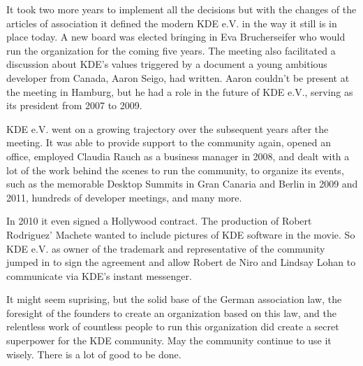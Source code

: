 It took two more years to implement all the decisions but with the changes of the articles of association it defined the modern KDE e.V. in the way it still is in place today. A new board was elected bringing in Eva Brucherseifer who would run the organization for the coming five years. The meeting also facilitated a discussion about KDE's values triggered by a document a young ambitious developer from Canada, Aaron Seigo, had written. Aaron couldn't be present at the meeting in Hamburg, but he had a role in the future of KDE e.V., serving as its president from 2007 to 2009.

KDE e.V. went on a growing trajectory over the subsequent years after the meeting. It was able to provide support to the community again, opened an office, employed Claudia Rauch as a business manager in 2008, and dealt with a lot of the work behind the scenes to run the community, to organize its events, such as the memorable Desktop Summits in Gran Canaria and Berlin in 2009 and 2011, hundreds of developer meetings, and many more.

In 2010 it even signed a Hollywood contract. The production of Robert Rodriguez' Machete wanted to include pictures of KDE software in the movie. So KDE e.V. as owner of the trademark and representative of the community jumped in to sign the agreement and allow Robert de Niro and Lindsay Lohan to communicate via KDE's instant messenger.

It might seem suprising, but the solid base of the German association law, the foresight of the founders to create an organization based on this law, and the relentless work of countless people to run this organization did create a secret superpower for the KDE community. May the community continue to use it wisely. There is a lot of good to be done.
